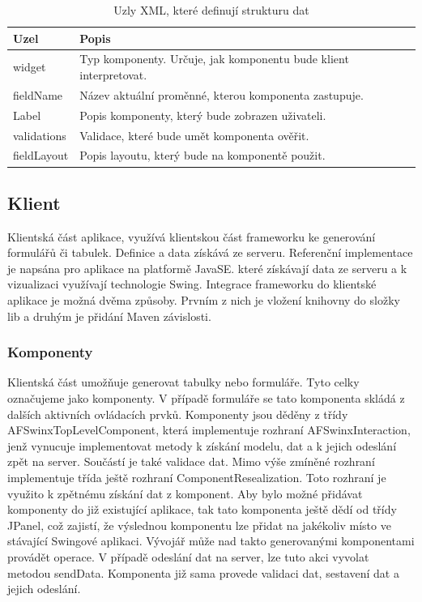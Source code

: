 \begin{table}[width=\linewidth]
\begin{center}
\caption{Uzly XML, které definují strukturu dat}
\label{table:xmlComponentAttributes}
\begin{tabular}{|p{7cm}|p{7cm}|}
\hline
\textbf{Uzel} & \textbf{Popis} \\
\hline
widget & 
Typ komponenty. Určuje, jak komponentu bude klient interpretovat. \\
\hline
fieldName &
Název aktuální proměnné, kterou komponenta zastupuje. \\
\hline
Label &
Popis komponenty, který bude zobrazen uživateli. \\
\hline
validations &
Validace, které bude umět komponenta ověřit. \\
\hline
fieldLayout&
Popis layoutu, který bude na komponentě použit. \\
\hline
\end{tabular}
\end{center}
\end{table}


\subsection{Klient}
Klientská část aplikace, využívá klientskou část frameworku ke generování formulářů či tabulek. Definice a data získává ze serveru. Referenční implementace je napsána pro aplikace na platformě JavaSE. které získávají data ze serveru a k vizualizaci využívají technologie Swing. Integrace frameworku do klientské aplikace je možná dvěma způsoby. Prvním z nich je vložení knihovny do složky lib a druhým je přidání Maven \cite{maven} závislosti. 
\subsubsection{Komponenty}
Klientská část umožňuje generovat tabulky nebo formuláře. Tyto celky označujeme jako komponenty. V případě formuláře se tato komponenta skládá z dalších aktivních ovládacích prvků. Komponenty jsou děděny z třídy AFSwinxTopLevelComponent, která implementuje rozhraní AFSwinxInteraction, jenž vynucuje implementovat metody k získání modelu, dat a k jejich odeslání zpět na server. Součástí je také validace dat. Mimo výše zmíněné rozhraní implementuje třída ještě rozhraní ComponentResealization. Toto rozhraní je využito k zpětnému získání dat z komponent. Aby bylo možné přidávat komponenty do již existující aplikace, tak tato komponenta ještě dědí od třídy JPanel, což zajistí, že výslednou komponentu lze přidat na jakékoliv místo ve stávající Swingové aplikaci. Vývojář může nad takto generovanými komponentami provádět operace. V případě odeslání dat na server, lze tuto akci vyvolat metodou sendData. Komponenta již sama provede validaci dat, sestavení dat a jejich odeslání.

